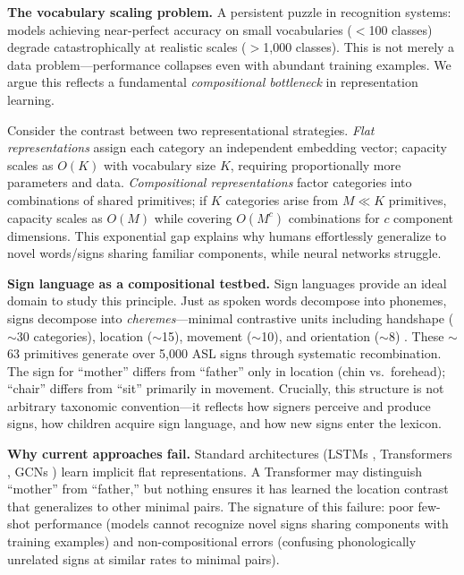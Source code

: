 \documentclass[runningheads]{llncs}
\begin{document}
\textbf{The vocabulary scaling problem.} A persistent puzzle in recognition systems: models achieving near-perfect accuracy on small vocabularies ($<$100 classes) degrade catastrophically at realistic scales ($>$1,000 classes). This is not merely a data problem---performance collapses even with abundant training examples. We argue this reflects a fundamental \textit{compositional bottleneck} in representation learning.

Consider the contrast between two representational strategies. \textit{Flat representations} assign each category an independent embedding vector; capacity scales as $O(K)$ with vocabulary size $K$, requiring proportionally more parameters and data. \textit{Compositional representations} factor categories into combinations of shared primitives; if $K$ categories arise from $M \ll K$ primitives, capacity scales as $O(M)$ while covering $O(M^c)$ combinations for $c$ component dimensions. This exponential gap explains why humans effortlessly generalize to novel words/signs sharing familiar components, while neural networks struggle.

\textbf{Sign language as a compositional testbed.} Sign languages provide an ideal domain to study this principle. Just as spoken words decompose into phonemes, signs decompose into \textit{cheremes}---minimal contrastive units including handshape ($\sim$30 categories), location ($\sim$15), movement ($\sim$10), and orientation ($\sim$8) \cite{stokoe1960sign,battison1978lexical}. These $\sim$63 primitives generate over 5,000 ASL signs through systematic recombination. The sign for ``mother'' differs from ``father'' only in location (chin vs.\ forehead); ``chair'' differs from ``sit'' primarily in movement. Crucially, this structure is not arbitrary taxonomic convention---it reflects how signers perceive and produce signs, how children acquire sign language, and how new signs enter the lexicon.

\textbf{Why current approaches fail.} Standard architectures (LSTMs \cite{hochreiter1997lstm}, Transformers \cite{vaswani2017attention}, GCNs \cite{kipf2017semi}) learn implicit flat representations. A Transformer may distinguish ``mother'' from ``father,'' but nothing ensures it has learned the location contrast that generalizes to other minimal pairs. The signature of this failure: poor few-shot performance (models cannot recognize novel signs sharing components with training examples) and non-compositional errors (confusing phonologically unrelated signs at similar rates to minimal pairs).
\end{document}
